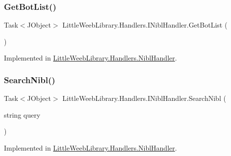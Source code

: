 \subsubsection{\texorpdfstring{Get\+Bot\+List()}{GetBotList()}}
{\footnotesize\ttfamily Task$<$J\+Object$>$ Little\+Weeb\+Library.\+Handlers.\+I\+Nibl\+Handler.\+Get\+Bot\+List (\begin{DoxyParamCaption}{ }\end{DoxyParamCaption})}



Implemented in \mbox{\hyperlink{class_little_weeb_library_1_1_handlers_1_1_nibl_handler_aac05976a2e1a688dd187ccca513ab3cc}{Little\+Weeb\+Library.\+Handlers.\+Nibl\+Handler}}.

\mbox{\label{interface_little_weeb_library_1_1_handlers_1_1_i_nibl_handler_a751ab95fe78f072abef69d89e5557ad1}} 
\subsubsection{\texorpdfstring{Search\+Nibl()}{SearchNibl()}\hspace{0.1cm}{\footnotesize\ttfamily [1/2]}}
{\footnotesize\ttfamily Task$<$J\+Object$>$ Little\+Weeb\+Library.\+Handlers.\+I\+Nibl\+Handler.\+Search\+Nibl (\begin{DoxyParamCaption}\item[{string}]{query }\end{DoxyParamCaption})}



Implemented in \mbox{\hyperlink{class_little_weeb_library_1_1_handlers_1_1_nibl_handler_aa5fcae94d3322123b784078727a3db67}{Little\+Weeb\+Library.\+Handlers.\+Nibl\+Handler}}.

\mbox{\label{interface_little_weeb_library_1_1_handlers_1_1_i_nibl_handler_aea34d508a803bf76f119e95b6e9e9cf0}} 
